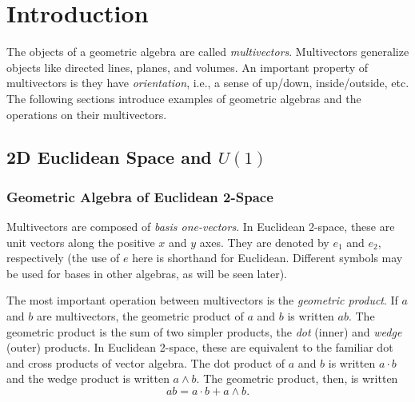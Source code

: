 \chapter{Introduction}
	
	The objects of a geometric algebra are called \emph{multivectors}. Multivectors generalize objects like directed lines, planes, and volumes. An important property of multivectors is they have \emph{orientation}, i.e., a sense of up/down, inside/outside, etc. The following sections introduce examples of geometric algebras and the operations on their multivectors.
	\section{2D Euclidean Space and $U\left( 1\right) $}
	\subsection{Geometric Algebra of Euclidean 2-Space}
	Multivectors are composed of \emph{basis one-vectors}. In Euclidean 2-space, these are unit vectors along the positive $x$ and $y$ axes. They are denoted by $e_1$ and $e_2$, respectively (the use of $e$ here is shorthand for Euclidean. Different symbols may be used for bases in other algebras, as will be seen later).
	
	The most important operation between multivectors is the \emph{geometric product}. If $a$ and $b$ are multivectors, the geometric product of $a$ and $b$ is written $ab$. The geometric product is the sum of two simpler products, the \emph{dot} (inner) and \emph{wedge} (outer) products. In Euclidean 2-space, these are equivalent to the familiar dot and cross products of vector algebra. The dot product of $a$ and $b$ is written $a \cdot b$ and the wedge product is written $a \wedge b$. The geometric product, then, is written
	\[
	ab = a \cdot b + a \wedge b.
	\]
	

